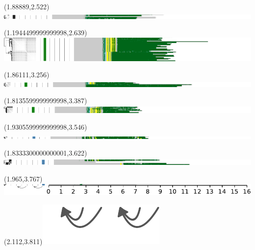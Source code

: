 \documentclass{article}
\begin{document}
\begin{textblock}{13}(1.88889,2.522)\includegraphics{./Figure_S5/chr8-HG001.pdf}\end{textblock}
\begin{textblock}{13}(1.1944499999999998,2.639)\includegraphics{./Figure_S5/chr8-HG002.pdf}\end{textblock}
\begin{textblock}{13}(1.86111,3.256)\includegraphics{./Figure_S5/chr8-HG003.pdf}\end{textblock}
\begin{textblock}{13}(1.8135599999999998,3.387)\includegraphics{./Figure_S5/chr8-HG004.pdf}\end{textblock}
\begin{textblock}{13}(1.9305599999999998,3.546)\includegraphics{./Figure_S5/chr8-HG005.pdf}\end{textblock}
\begin{textblock}{13}(1.8333300000000001,3.622)\includegraphics{./Figure_S5/chr8-HG006.pdf}\end{textblock}
\begin{textblock}{13}(1.965,3.767)\includegraphics{./Figure_S5/chr8-HG007.pdf}\end{textblock}
\begin{textblock}{13}(2.112,3.811)\includegraphics[width=.755in,keepaspectratio]{Figure_4/fatter-arrows.pdf}\end{textblock}
\end{document}
